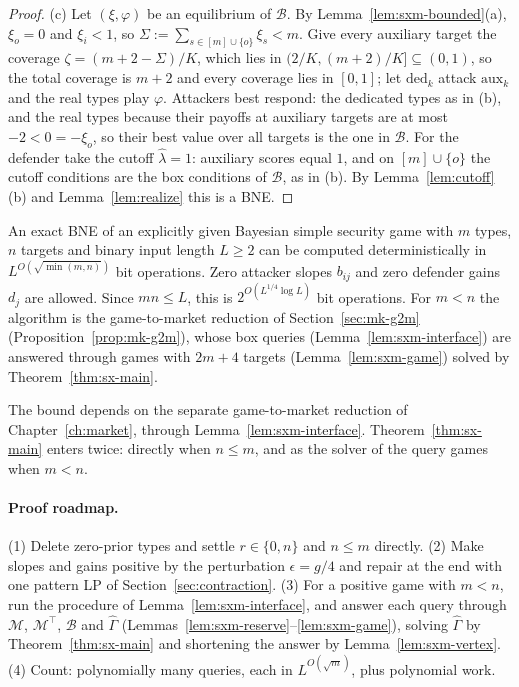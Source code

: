 \begin{proof}
(c) Let $(\xi,\varphi)$ be an equilibrium of $\mathcal B$. By Lemma~\ref{lem:sxm-bounded}(a),
$\xi_o=0$ and $\xi_i<1$, so $\Sigma:=\sum_{s\in[m]\cup\{o\}}\xi_s<m$. Give every auxiliary target the
coverage $\zeta=(m+2-\Sigma)/K$, which lies in $(2/K,(m+2)/K]\subseteq(0,1)$, so the total coverage is
$m+2$ and every coverage lies in $[0,1]$; let $\mathrm{ded}_k$ attack $\mathrm{aux}_k$ and the real types
play $\varphi$. Attackers best respond: the dedicated types as in (b), and the real types because their
payoffs at auxiliary targets are at most $-2<0=-\xi_o$, so their best value over all targets is the one
in $\mathcal B$. For the defender take the cutoff $\hat\lambda=1$: auxiliary scores equal $1$, and on
$[m]\cup\{o\}$ the cutoff conditions are the box conditions of $\mathcal B$, as in (b). By
Lemma~\ref{lem:cutoff}(b) and Lemma~\ref{lem:realize} this is a BNE.
\end{proof}

\begin{proposition}\label{prop:sx-min}
\statusrefereed
An exact BNE of an explicitly given Bayesian simple security game with $m$ types, $n$ targets and binary
input length $L\ge2$ can be computed deterministically in $L^{O(\sqrt{\min(m,n)})}$ bit operations. Zero
attacker slopes $b_{ij}$ and zero defender gains $d_j$ are allowed. Since $mn\le L$, this is
$2^{O(L^{1/4}\log L)}$ bit operations. For $m<n$ the algorithm is the game-to-market reduction of
Section~\ref{sec:mk-g2m} (Proposition~\ref{prop:mk-g2m}), whose box queries
(Lemma~\ref{lem:sxm-interface}) are answered through games with $2m+4$ targets
(Lemma~\ref{lem:sxm-game}) solved by Theorem~\ref{thm:sx-main}.
\end{proposition}

The bound depends on the separate game-to-market reduction of Chapter~\ref{ch:market}, through
Lemma~\ref{lem:sxm-interface}. Theorem~\ref{thm:sx-main} enters twice: directly when $n\le m$, and as the
solver of the query games when $m<n$.

\paragraph{Proof roadmap.} (1) Delete zero-prior types and settle $r\in\{0,n\}$ and $n\le m$ directly.
(2) Make slopes and gains positive by the perturbation $\epsilon=g/4$ and repair at the end with one
pattern LP of Section~\ref{sec:contraction}. (3) For a positive game with $m<n$, run the procedure of
Lemma~\ref{lem:sxm-interface}, and answer each query through $\mathcal M$, $\mathcal M^\top$,
$\mathcal B$ and $\widehat\Gamma$ (Lemmas~\ref{lem:sxm-reserve}--\ref{lem:sxm-game}), solving
$\widehat\Gamma$ by Theorem~\ref{thm:sx-main} and shortening the answer by Lemma~\ref{lem:sxm-vertex}.
(4) Count: polynomially many queries, each in $L^{O(\sqrt m)}$, plus polynomial work.

